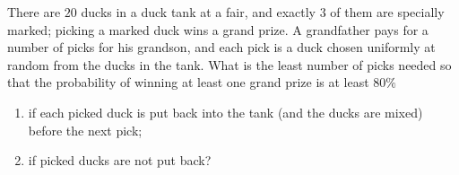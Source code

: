 There are $20$ ducks in a duck tank at a fair, and exactly $3$ of them are specially marked; picking a marked duck wins a grand prize. A grandfather pays for a number of picks for his grandson, and each pick is a duck chosen uniformly at random from the ducks in the tank. What is the least number of picks needed so that the probability of winning at least one grand prize is at least $80\%$
\begin{enumerate}
\item[(a)] if each picked duck is put back into the tank (and the ducks are mixed) before the next pick;
\item[(b)] if picked ducks are not put back?
\end{enumerate}
